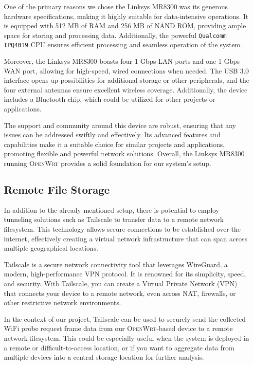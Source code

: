 \documentclass{article}
\begin{document}
One of the primary reasons we chose the Linksys MR8300 was its generous hardware specifications, making it highly suitable for data-intensive operations. It is equipped with 512 MB of RAM and 256 MB of NAND ROM, providing ample space for storing and processing data. Additionally, the powerful \texttt{Qualcomm IPQ4019} CPU ensures efficient processing and seamless operation of the system.

Moreover, the Linksys MR8300 boasts four 1 Gbps LAN ports and one 1 Gbps WAN port, allowing for high-speed, wired connections when needed. The USB 3.0 interface opens up possibilities for additional storage or other peripherals, and the four external antennas ensure excellent wireless coverage. Additionally, the device includes a Bluetooth chip, which could be utilized for other projects or applications.

The support and community around this device are robust, ensuring that any issues can be addressed swiftly and effectively. Its advanced features and capabilities make it a suitable choice for similar projects and applications, promoting flexible and powerful network solutions. Overall, the Linksys MR8300 running \textsc{OpenWrt} provides a solid foundation for our system's setup.

\subsection{Remote File Storage}

In addition to the already mentioned setup, there is potential to employ tunneling solutions such as Tailscale to transfer data to a remote network filesystem. This technology allows secure connections to be established over the internet, effectively creating a virtual network infrastructure that can span across multiple geographical locations.

Tailscale is a secure network connectivity tool that leverages WireGuard, a modern, high-performance VPN protocol. It is renowned for its simplicity, speed, and security. With Tailscale, you can create a Virtual Private Network (VPN) that connects your device to a remote network, even across NAT, firewalls, or other restrictive network environments.

In the context of our project, Tailscale can be used to securely send the collected WiFi probe request frame data from our \textsc{OpenWrt}-based device to a remote network filesystem. This could be especially useful when the system is deployed in a remote or difficult-to-access location, or if you want to aggregate data from multiple devices into a central storage location for further analysis.
\end{document}
